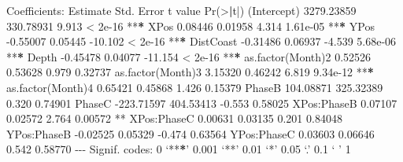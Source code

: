 \documentclass[
  oneside]{krantz}
\newenvironment{Shaded}{\begin{snugshade}}{\end{snugshade}}
\newcommand{\DecValTok}[1]{\textcolor[rgb]{0.00,0.00,0.81}{#1}}
\newcommand{\ErrorTok}[1]{\textcolor[rgb]{0.64,0.00,0.00}{\textbf{#1}}}
\newcommand{\FloatTok}[1]{\textcolor[rgb]{0.00,0.00,0.81}{#1}}
\newcommand{\FunctionTok}[1]{\textcolor[rgb]{0.00,0.00,0.00}{#1}}
\newcommand{\NormalTok}[1]{#1}
\newcommand{\SpecialCharTok}[1]{\textcolor[rgb]{0.00,0.00,0.00}{#1}}
\begin{document}
\begin{Shaded}
\begin{Highlighting}[]
\NormalTok{Coefficients}\SpecialCharTok{:}
\NormalTok{                    Estimate Std. Error t value }\FunctionTok{Pr}\NormalTok{(}\SpecialCharTok{\textgreater{}}\ErrorTok{|}\NormalTok{t}\SpecialCharTok{|}\NormalTok{)    }
\NormalTok{(Intercept)       }\FloatTok{3279.23859}  \FloatTok{330.78931}   \FloatTok{9.913}  \SpecialCharTok{\textless{}} \FloatTok{2e{-}16} \SpecialCharTok{**}\ErrorTok{*}
\NormalTok{XPos                 }\FloatTok{0.08446}    \FloatTok{0.01958}   \FloatTok{4.314} \FloatTok{1.61e{-}05} \SpecialCharTok{**}\ErrorTok{*}
\NormalTok{YPos                }\SpecialCharTok{{-}}\FloatTok{0.55007}    \FloatTok{0.05445} \SpecialCharTok{{-}}\FloatTok{10.102}  \SpecialCharTok{\textless{}} \FloatTok{2e{-}16} \SpecialCharTok{**}\ErrorTok{*}
\NormalTok{DistCoast           }\SpecialCharTok{{-}}\FloatTok{0.31486}    \FloatTok{0.06937}  \SpecialCharTok{{-}}\FloatTok{4.539} \FloatTok{5.68e{-}06} \SpecialCharTok{**}\ErrorTok{*}
\NormalTok{Depth               }\SpecialCharTok{{-}}\FloatTok{0.45478}    \FloatTok{0.04077} \SpecialCharTok{{-}}\FloatTok{11.154}  \SpecialCharTok{\textless{}} \FloatTok{2e{-}16} \SpecialCharTok{**}\ErrorTok{*}
\FunctionTok{as.factor}\NormalTok{(Month)}\DecValTok{2}    \FloatTok{0.52526}    \FloatTok{0.53628}   \FloatTok{0.979}  \FloatTok{0.32737}    
\FunctionTok{as.factor}\NormalTok{(Month)}\DecValTok{3}    \FloatTok{3.15320}    \FloatTok{0.46242}   \FloatTok{6.819} \FloatTok{9.34e{-}12} \SpecialCharTok{**}\ErrorTok{*}
\FunctionTok{as.factor}\NormalTok{(Month)}\DecValTok{4}    \FloatTok{0.65421}    \FloatTok{0.45868}   \FloatTok{1.426}  \FloatTok{0.15379}    
\NormalTok{PhaseB             }\FloatTok{104.08871}  \FloatTok{325.32389}   \FloatTok{0.320}  \FloatTok{0.74901}    
\NormalTok{PhaseC            }\SpecialCharTok{{-}}\FloatTok{223.71597}  \FloatTok{404.53413}  \SpecialCharTok{{-}}\FloatTok{0.553}  \FloatTok{0.58025}    
\NormalTok{XPos}\SpecialCharTok{:}\NormalTok{PhaseB          }\FloatTok{0.07107}    \FloatTok{0.02572}   \FloatTok{2.764}  \FloatTok{0.00572} \SpecialCharTok{**} 
\NormalTok{XPos}\SpecialCharTok{:}\NormalTok{PhaseC          }\FloatTok{0.00631}    \FloatTok{0.03135}   \FloatTok{0.201}  \FloatTok{0.84048}    
\NormalTok{YPos}\SpecialCharTok{:}\NormalTok{PhaseB         }\SpecialCharTok{{-}}\FloatTok{0.02525}    \FloatTok{0.05329}  \SpecialCharTok{{-}}\FloatTok{0.474}  \FloatTok{0.63564}    
\NormalTok{YPos}\SpecialCharTok{:}\NormalTok{PhaseC          }\FloatTok{0.03603}    \FloatTok{0.06646}   \FloatTok{0.542}  \FloatTok{0.58770}    
\SpecialCharTok{{-}{-}{-}}
\NormalTok{Signif. codes}\SpecialCharTok{:}  \DecValTok{0}\NormalTok{ ‘}\SpecialCharTok{**}\ErrorTok{*}\NormalTok{’ }\FloatTok{0.001}\NormalTok{ ‘}\SpecialCharTok{**}\NormalTok{’ }\FloatTok{0.01}\NormalTok{ ‘}\SpecialCharTok{*}\NormalTok{’ }\FloatTok{0.05}\NormalTok{ ‘.’ }\FloatTok{0.1}\NormalTok{ ‘ ’ }\DecValTok{1}


\end{Highlighting}
\end{Shaded}
\end{document}
